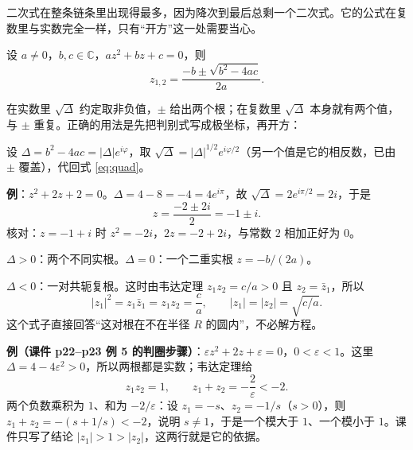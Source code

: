 \documentclass[11pt]{ctexart}
\let\origsubhdr\subhdr
\renewcommand{\subhdr}[1]{\par\needspace{4\baselineskip}\origsubhdr{#1}}
\let\orighdr\hdr
\renewcommand{\hdr}[2]{\par\orighdr{#1}{#2}}
\begin{document}

二次式在整条链条里出现得最多，因为降次到最后总剩一个二次式。它的公式在复数里与实数完全一样，只有“开方”这一处需要当心。


设 $a\ne0$，$b,c\in\mathbb{C}$，$az^{2}+bz+c=0$，则
\begin{equation}
z_{1,2}=\frac{-b\pm\sqrt{b^{2}-4ac}}{2a}.
\label{eq:quad}
\end{equation}

在实数里 $\sqrt{\Delta}$ 约定取非负值，$\pm$ 给出两个根；在复数里 $\sqrt{\Delta}$ 本身就有两个值，与 $\pm$ 重复。正确的用法是先把判别式写成极坐标，再开方：

设 $\Delta=b^{2}-4ac=|\Delta|e^{i\varphi}$，取 $\sqrt{\Delta}=|\Delta|^{1/2}e^{i\varphi/2}$（另一个值是它的相反数，已由 $\pm$ 覆盖），代回式 \eqref{eq:quad}。

\textbf{例}：$z^{2}+2z+2=0$。$\Delta=4-8=-4=4e^{i\pi}$，故 $\sqrt{\Delta}=2e^{i\pi/2}=2i$，于是
\[ z=\frac{-2\pm2i}{2}=-1\pm i . \]
核对：$z=-1+i$ 时 $z^{2}=-2i$，$2z=-2+2i$，与常数 $2$ 相加正好为 $0$。



$\Delta>0$：两个不同实根。$\Delta=0$：一个二重实根 $z=-b/(2a)$。

$\Delta<0$：一对共轭复根。这时由韦达定理 $z_1z_2=c/a>0$ 且 $z_2=\bar z_1$，所以
\[ |z_1|^{2}=z_1\bar z_1=z_1z_2=\frac{c}{a},
\qquad |z_1|=|z_2|=\sqrt{c/a}. \]
这个式子直接回答“这对根在不在半径 $R$ 的圆内”，不必解方程。

\textbf{例（课件 p22--p23 例 5 的判圈步骤）}：$\varepsilon z^{2}+2z+\varepsilon=0$，$0<\varepsilon<1$。这里 $\Delta=4-4\varepsilon^{2}>0$，所以两根都是实数；韦达定理给
\[ z_1z_2=1,\qquad z_1+z_2=-\frac{2}{\varepsilon}<-2 . \]
两个负数乘积为 $1$、和为 $-2/\varepsilon$：设 $z_1=-s$、$z_2=-1/s$（$s>0$），则 $z_1+z_2=-(s+1/s)<-2$，说明 $s\ne1$，于是一个模大于 $1$、一个模小于 $1$。课件只写了结论 $|z_1|>1>|z_2|$，这两行就是它的依据。


\end{document}
